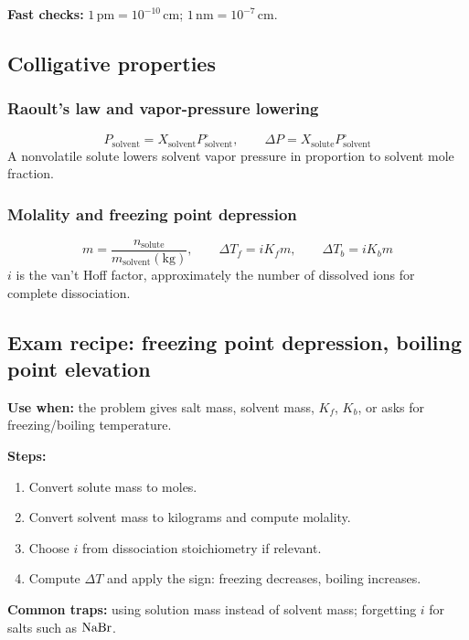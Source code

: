 \textbf{Fast checks:} \(1\,\mathrm{pm}=10^{-10}\,\mathrm{cm}\); \(1\,\mathrm{nm}=10^{-7}\,\mathrm{cm}\).

\subsection{Colligative properties}

\subsubsection{Raoult's law and vapor-pressure lowering}
\[
P_{\mathrm{solvent}}=X_{\mathrm{solvent}}P^\circ_{\mathrm{solvent}}, \qquad
\Delta P=X_{\mathrm{solute}}P^\circ_{\mathrm{solvent}}
\]
A nonvolatile solute lowers solvent vapor pressure in proportion to solvent mole fraction.

\subsubsection{Molality and freezing point depression}
\[
m=\frac{n_{\mathrm{solute}}}{m_{\mathrm{solvent}}(\mathrm{kg})}, \qquad
\Delta T_f=iK_fm, \qquad \Delta T_b=iK_bm
\]
\(i\) is the van't Hoff factor, approximately the number of dissolved ions for complete dissociation.

\subsection{Exam recipe: freezing point depression, boiling point elevation}
\textbf{Use when:} the problem gives salt mass, solvent mass, \(K_f\), \(K_b\), or asks for freezing/boiling temperature.

\textbf{Steps:}
\begin{enumerate}
    \item Convert solute mass to moles.
    \item Convert solvent mass to kilograms and compute molality.
    \item Choose \(i\) from dissociation stoichiometry if relevant.
    \item Compute \(\Delta T\) and apply the sign: freezing decreases, boiling increases.
\end{enumerate}

\textbf{Common traps:} using solution mass instead of solvent mass; forgetting \(i\) for salts such as \(\ce{NaBr}\).
